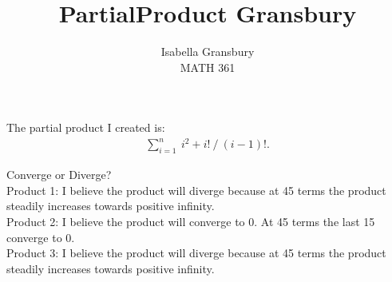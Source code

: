 \documentclass[12pt]{article}
\newenvironment{problem}[2][Problem]{\begin{trivlist}
\item[\hskip \labelsep {\bfseries #1}\hskip \labelsep {\bfseries #2.}]}{\end{trivlist}}
\begin{document}
 
 
\title{PartialProduct Gransbury}%
\author{Isabella Gransbury\\ %
MATH 361} %
 
\maketitle
 
\begin{problem}{1}The partial product I created is:
	\begin{align*}
	\sum_{i=1}^{n} \ i^2 + i! \ / \ (i-1)!.
	\end{align*}
\end{problem}

\begin{problem}{2}Converge or Diverge?\\
	Product 1: I believe the product will diverge because at 45 terms the product steadily increases towards positive infinity.\\
	Product 2: I believe the product will converge to 0. At 45 terms the last 15 converge to 0.\\
	Product 3: I believe the product will diverge because at 45 terms the product steadily increases towards positive infinity.
\end{problem}
\end{document}
